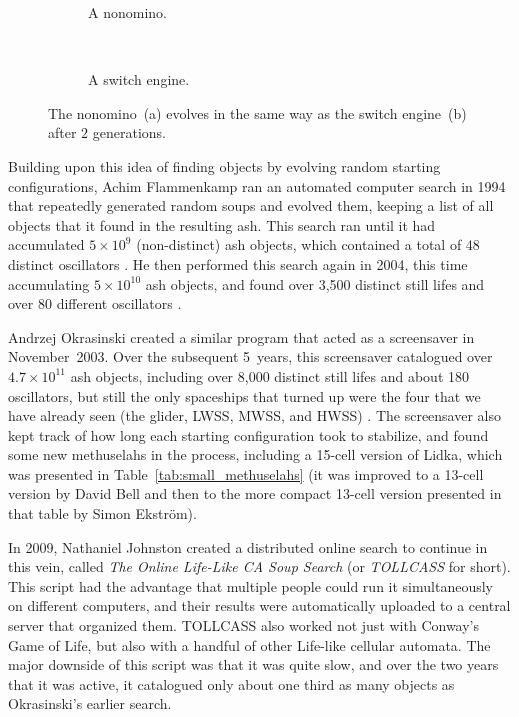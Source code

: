 \begin{figure}[!htb]
	\centering
	\begin{subfigure}{.48\textwidth}
		\centering {}
		\caption{A nonomino.}\label{fig:switch_engine_nonomino_non}
	\end{subfigure} \ \ \ \ %
	\begin{subfigure}{.48\textwidth}
		\centering {}
		\caption{A switch engine.}\label{fig:switch_engine_nonomino_not}
	\end{subfigure}
	\caption{The nonomino~(a) evolves in the same way as the switch engine~(b) after $2$ generations.}\label{fig:switch_engine_nonomino}
\end{figure}

Building upon this idea of finding objects by evolving random starting configurations, Achim Flammenkamp ran an automated computer search in 1994 that repeatedly generated random soups and evolved them, keeping a list of all objects that it found in the resulting ash. This search ran until it had accumulated $5 \times 10^9$ (non-distinct) ash objects, which contained a total of $48$ distinct oscillators \cite{Fla94}. He then performed this search again in 2004, this time accumulating $5 \times 10^{10}$ ash objects, and found over 3,500 distinct still lifes and over 80 different oscillators \cite{Fla04}.

Andrzej Okrasinski created a similar program that acted as a screensaver in November~2003. Over the subsequent 5~years, this screensaver catalogued over $4.7 \times 10^{11}$ ash objects, including over 8,000 distinct still lifes and about 180 oscillators, but still the only spaceships that turned up were the four that we have already seen (the glider, LWSS, MWSS, and HWSS) \cite{Okr03}. The screensaver also kept track of how long each starting configuration took to stabilize, and found some new methuselahs in the process, including a 15-cell version of Lidka, which was presented in Table~\ref{tab:small_methuselahs} (it was improved to a 13-cell version by David Bell and then to the more compact 13-cell version presented in that table by Simon Ekström).

In 2009, Nathaniel Johnston created a distributed online search to continue in this vein, called \emph{The Online Life-Like CA Soup Search} (or \emph{TOLLCASS} for short). This script had the advantage that multiple people could run it simultaneously on different computers, and their results were automatically uploaded to a central server that organized them. TOLLCASS also worked not just with Conway's Game of Life, but also with a handful of other Life-like cellular automata. The major downside of this script was that it was quite slow, and over the two years that it was active, it catalogued only about one third as many objects as Okrasinski's earlier search.

